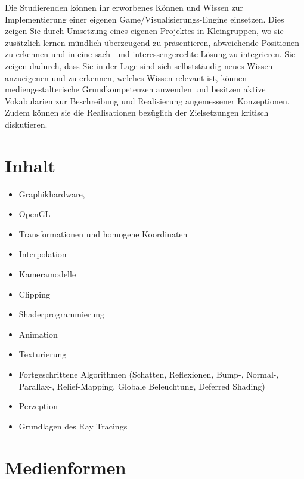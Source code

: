 Die Studierenden können ihr erworbenes Können und Wissen zur
Implementierung einer eigenen Game/Visualisierungs-Engine einsetzen.
Dies zeigen Sie durch Umsetzung eines eigenen Projektes in Kleingruppen,
wo sie zusätzlich lernen mündlich überzeugend zu präsentieren,
abweichende Positionen zu erkennen und in eine sach- und
interessengerechte Lösung zu integrieren. Sie zeigen dadurch, dass Sie
in der Lage sind sich selbstständig neues Wissen anzueigenen und zu
erkennen, welches Wissen relevant ist, können mediengestalterische
Grundkompetenzen anwenden und besitzen aktive Vokabularien zur
Beschreibung und Realisierung angemessener Konzeptionen. Zudem können
sie die Realisationen bezüglich der Zielsetzungen kritisch diskutieren.

\hypertarget{inhaltpathlabelmi-2017modulbeschreibungen-bachelorba_vc-computergrafik-und-animation}{%
\section*{Inhalt\label{/mi-2017/modulbeschreibungen-bachelor/BA_VC-computergrafik-und-animation}}\label{inhaltpathlabelmi-2017modulbeschreibungen-bachelorba_vc-computergrafik-und-animation}}

\begin{itemize}
\tightlist
\item
  Graphikhardware,
\item
  OpenGL
\item
  Transformationen und homogene Koordinaten
\item
  Interpolation
\item
  Kameramodelle
\item
  Clipping
\item
  Shaderprogrammierung
\item
  Animation
\item
  Texturierung
\item
  Fortgeschrittene Algorithmen (Schatten, Reflexionen, Bump-, Normal-,
  Parallax-, Relief-Mapping, Globale Beleuchtung, Deferred Shading)
\item
  Perzeption
\item
  Grundlagen des Ray Tracings
\end{itemize}

\hypertarget{medienformenpathlabelmi-2017modulbeschreibungen-bachelorba_vc-computergrafik-und-animation}{%
\section*{Medienformen\label{/mi-2017/modulbeschreibungen-bachelor/BA_VC-computergrafik-und-animation}}\label{medienformenpathlabelmi-2017modulbeschreibungen-bachelorba_vc-computergrafik-und-animation}}


